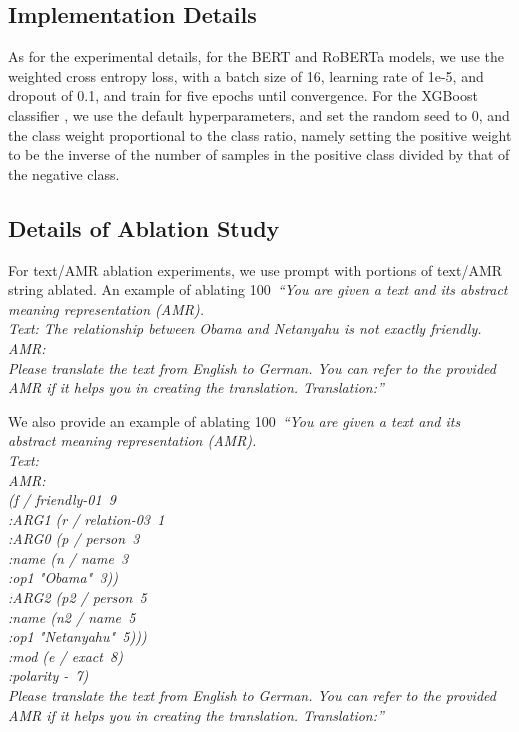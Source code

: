 \begin{enumerate}
\subsection{Implementation Details}\label{app:impl}

As for the experimental details, for the BERT and RoBERTa models, we use the weighted cross entropy loss, with a batch size of 16, learning rate of 1e-5, and dropout of 0.1, and train for five epochs until convergence.
For the XGBoost classifier \cite{chen2016xgboost}, we use the default hyperparameters, and set the random seed to 0, and the class weight proportional to the class ratio, namely setting the positive weight to be the inverse of the number of samples in the positive class divided by that of the negative class.




\subsection{Details of Ablation Study}\label{app:ablation}
For text/AMR ablation experiments, we use \ourmodel prompt with portions of text/AMR string ablated. An example of ablating 100\
\textit{``You are given a text and its abstract meaning representation (AMR).\\
Text: The relationship between Obama and Netanyahu is not exactly friendly.\\
AMR:\\
Please translate the text from English to German. You can refer to the provided AMR if it helps you in creating the translation.
Translation:''}

We also provide an example of ablating 100\
\textit{``You are given a text and its abstract meaning representation (AMR).\\
Text: \\
AMR:\\
(f / friendly-01~9\\
    :ARG1 (r / relation-03~1\\
        :ARG0 (p / person~3\\
            :name (n / name~3\\
                :op1 "Obama"~3))\\
        :ARG2 (p2 / person~5\\
            :name (n2 / name~5\\
                :op1 "Netanyahu"~5)))\\
    :mod (e / exact~8)\\
    :polarity -~7)\\
Please translate the text from English to German. You can refer to the provided AMR if it helps you in creating the translation.
Translation:''}

\end{enumerate}
